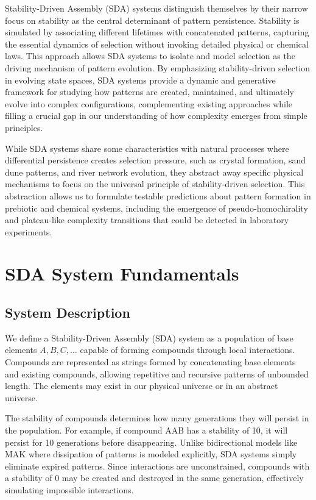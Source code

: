 \documentclass[preprint,12pt]{elsarticle}
\begin{document}
Stability-Driven Assembly (SDA) systems distinguish themselves by their narrow focus on stability as the central determinant of pattern persistence. Stability is simulated by associating different lifetimes with concatenated patterns, capturing the essential dynamics of selection without invoking detailed physical or chemical laws. This approach allows SDA systems to isolate and model selection as the driving mechanism of pattern evolution. By emphasizing stability-driven selection in evolving state spaces, SDA systems provide a dynamic and generative framework for studying how patterns are created, maintained, and ultimately evolve into complex configurations, complementing existing approaches while filling a crucial gap in our understanding of how complexity emerges from simple principles.

While SDA systems share some characteristics with natural processes where differential persistence creates selection pressure, such as crystal formation, sand dune patterns, and river network evolution, they abstract away specific physical mechanisms to focus on the universal principle of stability-driven selection. This abstraction allows us to formulate testable predictions about pattern formation in prebiotic and chemical systems, including the emergence of pseudo-homochirality and plateau-like complexity transitions that could be detected in laboratory experiments.

\section{SDA System Fundamentals}

\subsection{System Description}

We define a Stability-Driven Assembly (SDA) system as a population of base elements \( A, B, C, \dots \) capable of forming compounds through local interactions. Compounds are represented as strings formed by concatenating base elements and existing compounds, allowing repetitive and recursive patterns of unbounded length. The elements may exist in our physical universe or in an abstract universe. 

The stability of compounds determines how many generations they will persist in the population. For example, if compound AAB has a stability of 10, it will persist for 10 generations before disappearing. Unlike bidirectional models like MAK where dissipation of patterns is modeled explicitly, SDA systems simply eliminate expired patterns. Since interactions are unconstrained, compounds with a stability of 0 may be created and destroyed in the same generation, effectively simulating impossible interactions. 
\end{document}
